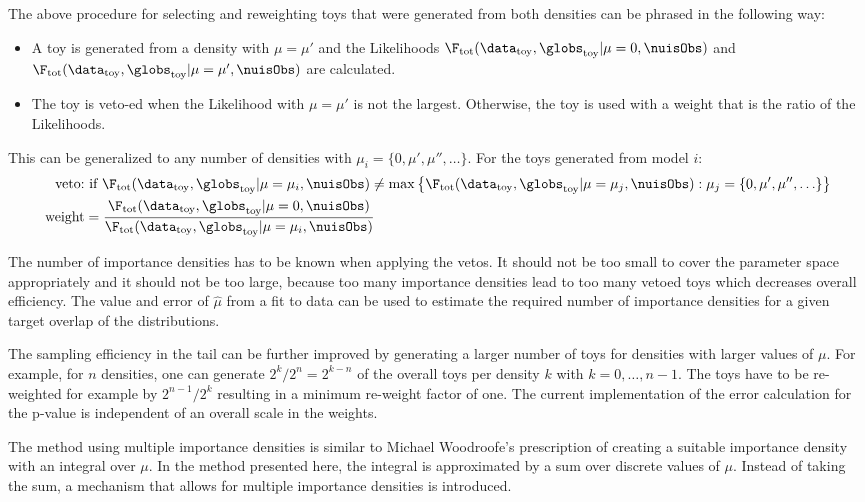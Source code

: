 The above procedure for selecting and reweighting toys that were generated from both densities can be phrased in the following way:
\begin{itemize}
   \item A toy is generated from a density with $\mu=\mu'$ and the Likelihoods $\F_{\rm tot}( \data_{\rm toy}, \globs_{\rm toy} | \mu=0,\nuisObs)$ and $\F_{\rm tot}( \data_{\rm toy}, \globs_{\rm toy} | \mu=\mu',\nuisObs)$ are calculated.
   \item The toy is veto-ed when the Likelihood with $\mu=\mu'$ is not the largest. Otherwise, the toy is used with a weight that is the ratio of the Likelihoods.
\end{itemize}
This can be generalized to any number of densities with $\mu_i=\{0, \mu', \mu'', \ldots\}$. For the toys generated from model $i$:
\begin{align}
\textrm{veto:}& \textrm{ if } \F_{\rm tot}( \data_{\rm toy}, \globs_{\rm toy} | \mu=\mu_i,\nuisObs) \neq \max\left\{ \F_{\rm tot}( \data_{\rm toy}, \globs_{\rm toy} | \mu=\mu_j,\nuisObs) : \mu_j = \{0, \mu', \mu'', \ldots\}\right\} \\
\textrm{weight} &= \frac{\F_{\rm tot}( \data_{\rm toy}, \globs_{\rm toy} | \mu=0,\nuisObs)}{\F_{\rm tot}( \data_{\rm toy}, \globs_{\rm toy} | \mu=\mu_i,\nuisObs)}
\end{align}


The number of importance densities has to be known when applying the vetos. It should not be too small to cover the parameter space appropriately and it should not be too large, because too many importance densities lead to too many vetoed toys which decreases overall efficiency. The value and error of $\hat{\mu}$ from a fit to data can be used to estimate the required number of importance densities for a given target overlap of the distributions.


The sampling efficiency in the tail can be further improved by generating a larger number of toys for densities with larger values of $\mu$. For example, for $n$ densities, one can generate $2^k / 2^n = 2^{k-n}$ of the overall toys per density $k$ with $k=0, \ldots, n-1$. The toys have to be re-weighted for example by $2^{n-1} / 2^k$ resulting in a  minimum re-weight factor of one. The current implementation of the error calculation for the p-value is independent of an overall scale in the weights.


The method using multiple importance densities is similar to Michael Woodroofe's \cite{Woodroofe} prescription of creating a suitable importance density with an integral over $\mu$. In the method presented here, the integral is approximated by a sum over discrete values of $\mu$. Instead of taking the sum, a mechanism that allows for multiple importance densities is introduced.
